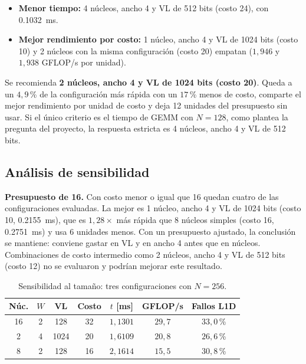 \documentclass[journal]{IEEEtran}
\begin{document}
\begin{itemize}
  \item \textbf{Menor tiempo:} 4 núcleos, ancho 4 y VL de 512 bits
    (costo 24), con \SI{0,1032}{ms}.
  \item \textbf{Mejor rendimiento por costo:} 1 núcleo, ancho 4 y VL de
    1024 bits (costo 10) y 2 núcleos con la misma configuración
    (costo 20) empatan ($1{,}946$ y $1{,}938$ GFLOP/s por unidad).
\end{itemize}

Se recomienda \textbf{2 núcleos, ancho 4 y VL de 1024 bits (costo 20)}.
Queda a un $4{,}9$\,\% de la configuración más rápida con un
$17$\,\% menos de costo, comparte el mejor rendimiento por unidad de
costo y deja 12 unidades del presupuesto sin usar. Si el único criterio
es el tiempo de GEMM con $N=128$, como plantea la pregunta del
proyecto, la respuesta estricta es 4 núcleos, ancho 4 y VL de 512 bits.

\subsection{Análisis de sensibilidad}

\textbf{Presupuesto de 16.} Con costo menor o igual que 16 quedan cuatro
de las configuraciones evaluadas. La mejor es 1 núcleo, ancho 4 y VL de
1024 bits (costo 10, \SI{0,2155}{ms}), que es $1{,}28\times$ más rápida
que 8 núcleos simples (costo 16, \SI{0,2751}{ms}) y usa 6 unidades
menos. Con un presupuesto ajustado, la conclusión se mantiene: conviene
gastar en VL y en ancho 4 antes que en núcleos. Combinaciones de costo
intermedio como 2 núcleos, ancho 4 y VL de 512 bits (costo 12) no se
evaluaron y podrían mejorar este resultado.

\begin{table}[!t]
\centering
\caption{Sensibilidad al tamaño: tres configuraciones con $N = 256$.}
\label{tab:e6_n256}
\footnotesize
\setlength{\tabcolsep}{2pt}
\begin{tabular}{|c|c|c|c|c|c|c|}
\hline
\textbf{Núc.} & $W$ & \textbf{VL} & \textbf{Costo} &
\textbf{$t$ [ms]} & \textbf{GFLOP/s} & \textbf{Fallos L1D} \\ \hline
16 & 2 & 128  & 32 & $1{,}1301$ & $29{,}7$ & $33{,}0$\,\% \\ \hline
2  & 4 & 1024 & 20 & $1{,}6109$ & $20{,}8$ & $26{,}6$\,\% \\ \hline
8  & 2 & 128  & 16 & $2{,}1614$ & $15{,}5$ & $30{,}8$\,\% \\ \hline
\end{tabular}
\end{table}
\end{document}
